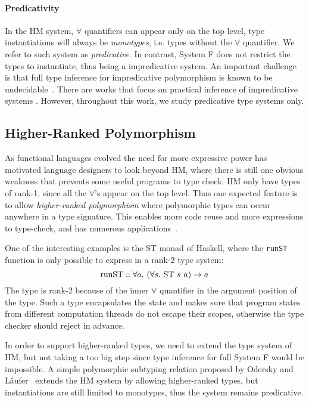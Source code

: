 \paragraph{Predicativity}
In the HM system, $\forall$ quantifiers can appear only on the top level,
type instantiations will always be \emph{monotypes},
i.e. types without the $\forall$ quantifier.
We refer to such system as \emph{predicative}.
In contrast, System F does not restrict the types to instantiate,
thus being a impredicative system.
An important challenge is that full type inference for impredicative
polymorphism is known to be undecidable~\cite{wells1999typability}.
There are works that focus on practical inference of impredicative systems .
However, throughout this work, we study predicative type systems only.

\subsection{Higher-Ranked Polymorphism}
As functional languages evolved the need for more expressive
power has motivated language designers to look beyond HM,
where there is still one obvious weakness that prevents some useful programs to type check:
HM only have types of rank-1, since all the $\forall$'s appear on the top level.
Thus one expected feature is to allow 
\emph{higher-ranked polymorphism} where polymorphic types can
occur anywhere in a type signature.
This enables more code reuse and more expressions to type-check, and has
numerous applications~\cite{jones1995functional,gill1993short,launchbury1995state,lammel2003scrap}.

One of the interesting examples is the ST monad of Haskell,
where the \verb|runST| function is only possible to express in a rank-2 type system:
$$\text{runST} :: \all[a]{(\all[s]{\text{ST}~s~a}) \to a}$$
The type is rank-2 because of the inner $\forall$ quantifier
in the argument position of the type.
Such a type encapsulates the state and makes sure
that program states from different computation threads do not escape their scopes,
otherwise the type checker should reject in advance.

In order to support higher-ranked types, we need to extend the type system of HM,
but not taking a too big step since type inference for full System F would be impossible.
A simple polymorphic subtyping relation
proposed by Odersky and L\"aufer~\cite{odersky1996putting}
extends the HM system by allowing higher-ranked types,
but instantiations are still limited to monotypes,
thus the system remains predicative.

